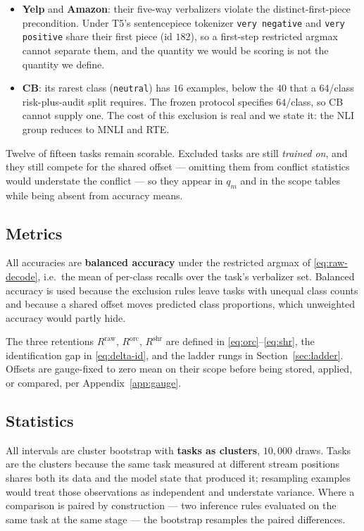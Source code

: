 \begin{itemize}
  \item \textbf{Yelp} and \textbf{Amazon}: their five-way verbalizers violate the
    distinct-first-piece precondition. Under T5's sentencepiece tokenizer
    \texttt{very negative} and \texttt{very positive} share their first piece
    (id $182$), so a first-step restricted argmax cannot separate them, and the
    quantity we would be scoring is not the quantity we define.
  \item \textbf{CB}: its rarest class (\texttt{neutral}) has $16$ examples, below
    the $40$ that a $64$/class risk-plus-audit split requires. The frozen protocol
    specifies $64$/class, so CB cannot supply one. The cost of this exclusion is
    real and we state it: the NLI group reduces to MNLI and RTE.
\end{itemize}

Twelve of fifteen tasks remain scorable. Excluded tasks are still \emph{trained
on}, and they still compete for the shared offset --- omitting them from conflict
statistics would understate the conflict --- so they appear in $q_m$ and in the
scope tables while being absent from accuracy means.

\subsection{Metrics}
\label{app:metrics}

All accuracies are \textbf{balanced accuracy} under the restricted argmax of
\eqref{eq:raw-decode}, i.e.\ the mean of per-class recalls over the task's
verbalizer set. Balanced accuracy is used because the exclusion rules leave tasks
with unequal class counts and because a shared offset moves predicted class
proportions, which unweighted accuracy would partly hide.

The three retentions $R^{\mathrm{raw}}$, $R^{\mathrm{orc}}$, $R^{\mathrm{shr}}$ are
defined in \eqref{eq:orc}--\eqref{eq:shr}, the identification gap in
\eqref{eq:delta-id}, and the ladder rungs in Section~\ref{sec:ladder}. Offsets are
gauge-fixed to zero mean on their scope before being stored, applied, or compared,
per Appendix~\ref{app:gauge}.

\subsection{Statistics}
\label{app:stats}

All intervals are cluster bootstrap with \textbf{tasks as clusters}, $10{,}000$
draws. Tasks are the clusters because the same task measured at different stream
positions shares both its data and the model state that produced it; resampling
examples would treat those observations as independent and understate variance.
Where a comparison is paired by construction --- two inference rules evaluated on
the same task at the same stage --- the bootstrap resamples the paired differences.

